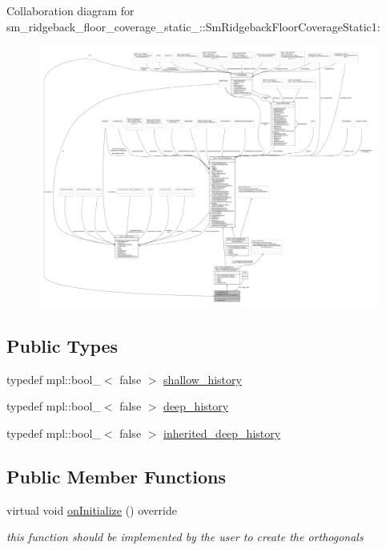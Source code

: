 Collaboration diagram for sm\+\_\+ridgeback\+\_\+floor\+\_\+coverage\+\_\+static\+\_\+:\+:Sm\+Ridgeback\+Floor\+Coverage\+Static1\+:
\nopagebreak
\begin{figure}[H]
\begin{center}
\leavevmode
\includegraphics[width=350pt]{structsm__ridgeback__floor__coverage__static__1_1_1SmRidgebackFloorCoverageStatic1__coll__graph}
\end{center}
\end{figure}
\subsection*{Public Types}
\begin{DoxyCompactItemize}
\item 
typedef mpl\+::bool\+\_\+$<$ false $>$ \hyperlink{structsm__ridgeback__floor__coverage__static__1_1_1SmRidgebackFloorCoverageStatic1_a366a57db295f10ea8a579ca74791401f}{shallow\+\_\+history}
\item 
typedef mpl\+::bool\+\_\+$<$ false $>$ \hyperlink{structsm__ridgeback__floor__coverage__static__1_1_1SmRidgebackFloorCoverageStatic1_a6729e53bd607decd77987152aea1f1bc}{deep\+\_\+history}
\item 
typedef mpl\+::bool\+\_\+$<$ false $>$ \hyperlink{structsm__ridgeback__floor__coverage__static__1_1_1SmRidgebackFloorCoverageStatic1_a99febc8e3982349cb93fff180e2eeffe}{inherited\+\_\+deep\+\_\+history}
\end{DoxyCompactItemize}
\subsection*{Public Member Functions}
\begin{DoxyCompactItemize}
\item 
virtual void \hyperlink{structsm__ridgeback__floor__coverage__static__1_1_1SmRidgebackFloorCoverageStatic1_a292f8cefd736248aa6f780c4aaa7f018}{on\+Initialize} () override
\begin{DoxyCompactList}\small\item\em this function should be implemented by the user to create the orthogonals \end{DoxyCompactList}\end{DoxyCompactItemize}
